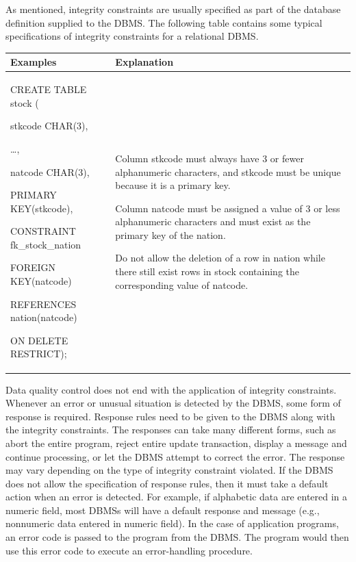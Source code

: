 \documentclass[
]{article}
\begin{document}
As mentioned, integrity constraints are usually specified as part of the
database definition supplied to the DBMS. The following table contains
some typical specifications of integrity constraints for a relational
DBMS.

\begin{longtable}[]{@{}
  >{\raggedright\arraybackslash}p{}
  >{\raggedright\arraybackslash}p{}@{}}
\toprule
Examples & Explanation \\
\midrule
\endhead
CREATE TABLE stock (

stkcode CHAR(3),

\ldots,

natcode CHAR(3),

PRIMARY KEY(stkcode),

CONSTRAINT fk\_stock\_nation

FOREIGN KEY(natcode)

REFERENCES nation(natcode)

ON DELETE RESTRICT); & Column stkcode must always have 3
or fewer alphanumeric characters,
and stkcode must be unique
because it is a primary key.

Column natcode must be assigned a
value of 3 or less alphanumeric
characters and must exist as the
primary key of the nation.

Do not allow the deletion of a
row in nation while there still
exist rows in stock containing
the corresponding value of
natcode. \\
\bottomrule
\end{longtable}

Data quality control does not end with the application of integrity
constraints. Whenever an error or unusual situation is detected by the
DBMS, some form of response is required. Response rules need to be given
to the DBMS along with the integrity constraints. The responses can take
many different forms, such as abort the entire program, reject entire
update transaction, display a message and continue processing, or let
the DBMS attempt to correct the error. The response may vary depending
on the type of integrity constraint violated. If the DBMS does not allow
the specification of response rules, then it must take a default action
when an error is detected. For example, if alphabetic data are entered
in a numeric field, most DBMSs will have a default response and message
(e.g., nonnumeric data entered in numeric field). In the case of
application programs, an error code is passed to the program from the
DBMS. The program would then use this error code to execute an
error-handling procedure.
\end{document}

